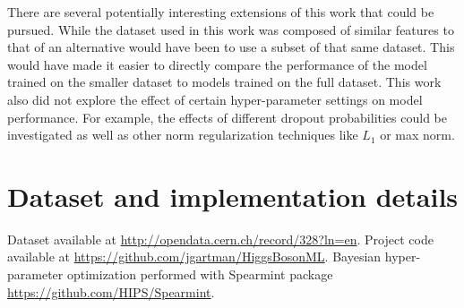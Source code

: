\documentclass[12pt,letterpaper]{article}
\begin{document}
There are several potentially interesting extensions of this work that could be pursued.  While the dataset used in this work was composed of similar features to that of \cite{Baldi:2014pta} an alternative would have been to use a subset of that same dataset.  This would have made it easier to directly compare the performance of the model trained on the smaller dataset to models trained on the full dataset.  This work also did not explore the effect of certain hyper-parameter settings on model performance.  For example, the effects of different dropout probabilities could be investigated as well as other norm regularization techniques like $L_1$ or max norm.

{\small


}

\appendix

\section{Dataset and implementation details}
Dataset available at \url{http://opendata.cern.ch/record/328?ln=en}.  Project code available at \url{https://github.com/jgartman/HiggsBosonML}.  Bayesian hyper-parameter optimization performed with Spearmint package \url{https://github.com/HIPS/Spearmint}.
\end{document}
